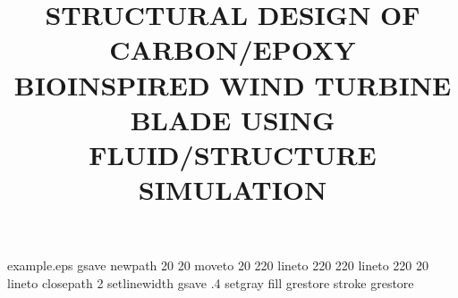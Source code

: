 %
%
%
%
%
\begin{filecontents*}{example.eps}
gsave
newpath
  20 20 moveto
  20 220 lineto
  220 220 lineto
  220 20 lineto
closepath
2 setlinewidth
gsave
  .4 setgray fill
grestore
stroke
grestore
\end{filecontents*}
%
\RequirePackage{fix-cm}
%
\documentclass[twocolumn]{svjour3}          %
%
\smartqed  %
%
\usepackage{graphicx}    %
\usepackage[utf8]{inputenc} %
\usepackage{multirow,array}  %
\usepackage{float}      %
%
%
%
%




\title{STRUCTURAL DESIGN OF CARBON/EPOXY BIOINSPIRED WIND TURBINE BLADE USING FLUID/STRUCTURE SIMULATION%
}


